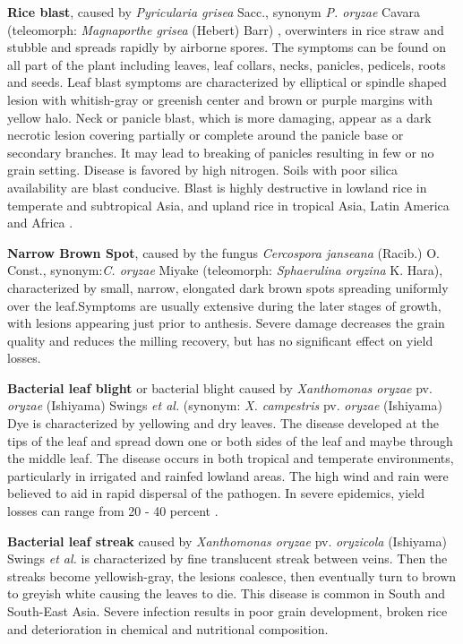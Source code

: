 \documentclass[12pt, oneside]{report}
\begin{document}
\textbf{Rice blast}, caused by \textit{Pyricularia grisea} Sacc., synonym \textit{P. oryzae} Cavara (teleomorph: \textit{Magnaporthe grisea} (Hebert) Barr) \citep{rossman1990pyricularia}, overwinters in rice straw and stubble and spreads rapidly by airborne spores. The symptoms can be found on all part of the plant including leaves, leaf collars, necks, panicles, pedicels, roots and seeds. Leaf blast symptoms are characterized by elliptical or spindle shaped lesion with whitish-gray or greenish center and brown or purple margins with yellow halo. Neck or panicle blast, which is more damaging, appear as a dark necrotic lesion covering partially or complete around the panicle base or secondary branches. It may lead to breaking of panicles resulting in few or no grain setting. Disease is favored by high nitrogen. Soils with poor silica availability are blast conducive. Blast is highly destructive in lowland rice in temperate and subtropical Asia, and upland rice in tropical Asia, Latin America and Africa \citep{ouricedisease}.

\textbf{Narrow Brown Spot}, caused by the fungus \textit{Cercospora janseana} (Racib.) O. Const., synonym:\textit{C. oryzae} Miyake (teleomorph: \textit{Sphaerulina oryzina} K. Hara), characterized by small, narrow, elongated dark brown spots spreading uniformly over the leaf.Symptoms are usually extensive during the later stages of growth, with lesions appearing just prior to anthesis. Severe damage decreases the grain quality and reduces the milling recovery, but has no significant effect on yield losses.

\textbf{Bacterial leaf blight} or bacterial blight caused by \textit{Xanthomonas oryzae} pv. \textit{oryzae} (Ishiyama) Swings \textit{et al.} (synonym: \textit{X. campestris} pv. \textit{oryzae} (Ishiyama) Dye is characterized by yellowing and dry leaves. The disease developed at the tips of the leaf and spread down one or both sides of the leaf and maybe through the middle leaf. The disease occurs in both tropical and temperate environments, particularly in irrigated and rainfed lowland areas. The high wind and rain were believed to aid in rapid dispersal of the pathogen. In severe epidemics, yield losses can range from 20 - 40 percent \citep{sonti1998bacterial}.

\textbf{Bacterial leaf streak} caused by \textit{Xanthomonas oryzae} pv. \textit{oryzicola} (Ishiyama) Swings \textit{et al.} is characterized by fine translucent streak between veins. Then the streaks become yellowish-gray, the lesions coalesce, then eventually turn to brown to greyish white causing the leaves to die. This disease is common in South and South-East Asia. Severe infection results in poor grain development, broken rice and deterioration in chemical and nutritional composition.
\end{document}
